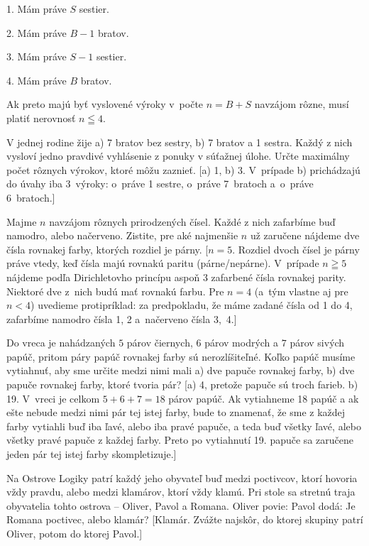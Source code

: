 {\smallskip
\item{1.} Mám práve $S$ sestier.
\item{2.} Mám práve $B-1$ bratov.
\item{3.} Mám práve $S-1$ sestier.
\item{4.} Mám práve $B$ bratov.

\smallskip\noindent
Ak preto majú byť vyslovené výroky v~počte $n=B+S$ navzájom rôzne,
musí platiť nerovnosť $n\leqq4$.


V jednej rodine žije a) 7 bratov bez sestry,
b) 7 bratov a 1 sestra. Každý z nich vysloví jedno pravdivé
vyhlásenie z ponuky v súťažnej úlohe. Určte maximálny
počet rôznych výrokov, ktoré môžu zaznieť.
[a) 1, b) 3. V~prípade b) prichádzajú do úvahy iba 3~výroky:
o~práve 1 sestre, o~práve 7~bratoch a~o~práve 6~bratoch.]

Majme $n$ navzájom rôznych prirodzených čísel. Každé
z nich zafarbíme buď namodro, alebo načerveno. Zistite, pre
aké najmenšie $n$ už zaručene nájdeme dve čísla rovnakej farby,
ktorých rozdiel je párny.
[$n=5$. Rozdiel dvoch čísel je párny práve vtedy, keď čísla majú rovnakú
paritu (párne/nepárne). V~prípade $n\geqq5$ nájdeme podľa
Dirichletovho princípu aspoň 3 zafarbené čísla rovnakej parity.
Niektoré dve z~nich budú mať rovnakú farbu.
Pre $n=4$ (a~tým vlastne aj pre $n<4$)
uvedieme protipríklad: za predpokladu, že máme zadané čísla od 1 do 4, zafarbíme namodro čísla 1, 2 a~načerveno čísla 3,~4.]

\D
Do vreca je nahádzaných $5$ párov čiernych, $6$ párov modrých
a $7$ párov sivých papúč, pritom páry papúč rovnakej farby
sú nerozlíšiteľné. Koľko papúč musíme vytiahnuť, aby sme
určite medzi nimi mali a) dve papuče rovnakej farby,
b) dve papuče rovnakej farby, ktoré tvoria pár?
[a) 4, pretože papuče sú troch farieb. b) 19. V~vreci je celkom
$5+6+7=18$ párov papúč. Ak vytiahneme 18 papúč a
ak ešte nebude medzi nimi pár tej istej farby, bude to znamenať, že sme
z každej farby vytiahli buď iba ľavé, alebo iba pravé papuče,
a teda buď všetky ľavé, alebo všetky pravé papuče z každej farby. Preto
po vytiahnutí 19. papuče sa zaručene jeden pár tej istej farby skompletizuje.]

Na Ostrove Logiky patrí každý jeho obyvateľ buď medzi
poctivcov, ktorí hovoria vždy pravdu, alebo medzi klamárov, ktorí
vždy klamú. Pri stole sa stretnú traja obyvatelia tohto ostrova --
Oliver, Pavol a Romana. Oliver povie:
 Pavol dodá:
Je Romana poctivec, alebo klamár?
[Klamár. Zvážte najskôr, do ktorej skupiny patrí Oliver, potom do ktorej
Pavol.]

}
